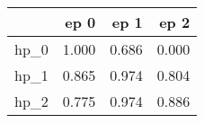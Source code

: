 \begin{tabular}{lrrr}
\toprule
{} &   ep 0 &   ep 1 &   ep 2 \\
\midrule
hp\_0 &  1.000 &  0.686 &  0.000 \\
hp\_1 &  0.865 &  0.974 &  0.804 \\
hp\_2 &  0.775 &  0.974 &  0.886 \\
\bottomrule
\end{tabular}
